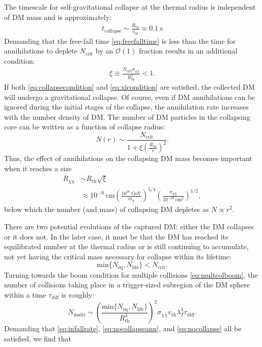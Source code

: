 \documentclass[preprintnumbers,amsmath,amssymb,prd,superscriptaddress]{revtex4}
\newcommand{\OO}{\mathcal{O}}
\newcommand{\GeV}{\text{GeV}}
\newcommand{\cm}{\text{cm}}
\def\r{\right)}
\def\l{\left(}
\begin{document}
The timescale for self-gravitational collapse at the thermal radius is independent of DM mass and is approximately:
\begin{align}
\label{eq:freefalltime}
  t_\text{collapse} \sim \frac{R_\text{th}}{v_\text{th}} \approx 0.1 ~\text{s}
\end{align}
Demanding that the free-fall time \eqref{eq:freefalltime} is less than the time for annihilations to deplete $N_\text{crit}$ by an $\OO(1)$ fraction results in an additional condition:
\begin{align}
\label{eq:xicondition}
\xi \equiv \frac{N_\text{crit} \sigma_{\chi \chi}}{R_\text{th}^2} < 1.
\end{align}
If both \eqref{eq:collapsecondition} and \eqref{eq:xicondition} are satisfied, the collected DM will undergo a gravitational collapse.
Of course, even if DM annihilations can be ignored during the initial stages of the collapse, the annihilation rate increases with the number density of DM. 
The number of DM particles in the collapsing core can be written as a function of collapse radius:
\begin{equation}
\label{eq:DMcollapsedeplete}
N(r) \sim \frac{N_\text{crit}}{1 + \xi \l \frac{R_\text{th}}{r}\r^2}. 
\end{equation}
Thus, the effect of annihilations on the collapsing DM mass becomes important when it reaches a size
\begin{align}
R_{\chi \chi} &\sim R_\text{th} \sqrt{\xi} \\
&\approx 10^{-9} ~\cm  \l \frac{10^{16} ~\GeV}{m_\chi} \r^{5/4} \l \frac{\sigma_{\chi \chi}}{10^{-30} ~\cm^2} \r^{1/2}, \nonumber
\end{align}
below which the number (and mass) of collapsing DM depletes as $N \propto r^2$. 

There are two potential evolutions of the captured DM: either the DM collapses or it does not. 
In the later case, it must be that the DM has reached its equilibrated number at the thermal radius or is still continuing to accumulate, not yet having the critical mass necessary for collapse within its lifetime:
\begin{equation}
\label{eq:nocollapseann}
\text{min}\{N_\text{eq}, N_\text{life}\} < N_\text{crit}.
\end{equation}
Turning towards the boom condition for multiple collisions \eqref{eq:multcolboom}, the number of collisions taking place in a trigger-sized subregion of the DM sphere within a time $\tau_\text{diff}$ is roughly:
\begin{equation}
\label{eq:nocollapse}
N_\text{multi} \sim \l \frac{\text{min}\{N_\text{eq}, N_\text{life}\}}{R_\text{th}^3} \r^2 \sigma_{\chi \chi} v_\text{th} \lambda_T^3 \tau_\text{diff}. 
\end{equation}
Demanding that \eqref{eq:infallrate}, \eqref{eq:nocollapseann}, and \eqref{eq:nocollapse} all be satisfied, we find that
\end{document}
